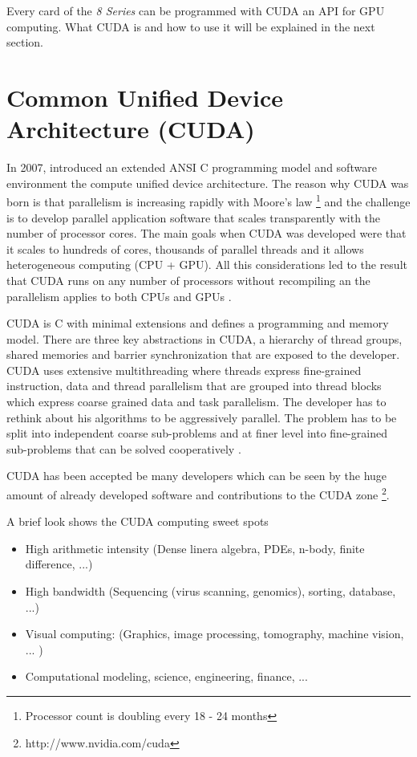 Every card of the \emph{8 Series} can be programmed with \gls{CUDA} an
\gls{API} for \gls{GPU} computing. What \gls{CUDA} is and how to use it will 
be explained in the next section. 


\section{Common Unified Device Architecture (CUDA)}%
\label{sub:common_unified_device_architecture_cuda_} 
In 2007, {} introduced an extended \gls{ANSI} C programming model and
software environment the compute unified device architecture. The reason why
\gls{CUDA} was born is that parallelism is increasing rapidly with Moore's law
\footnote{Processor count is doubling every 18 - 24 months} and the challenge is
to develop parallel application software that scales transparently with the
number of processor cores. The main goals when \gls{CUDA} was developed were
that it scales to hundreds of cores, thousands of parallel threads and it allows
heterogeneous computing (\gls{CPU} + \gls{GPU}). All this considerations led to
the result that \gls{CUDA} runs on any number of processors without recompiling
an the parallelism applies to both \glspl{CPU} and \glspl{GPU} 
\citep{citeulike:3839013}.

\Gls{CUDA} is C with minimal extensions and defines a programming and memory model.
There are three key abstractions in \gls{CUDA}, a hierarchy of thread groups, shared
memories and barrier synchronization \citep{citeulike:3325943} that are exposed
to the developer. \Gls{CUDA} uses extensive multithreading where threads express
fine-grained instruction, data and thread parallelism that are grouped into
thread blocks which express coarse grained data and task parallelism. The
developer has to rethink about his algorithms to be aggressively parallel.
The problem has to be split into independent coarse sub-problems and at finer
level into fine-grained sub-problems that can be solved cooperatively
\citep{citeulike:3325943}.

\Gls{CUDA} has been accepted be many developers which can be seen by the huge
amount of already developed software and contributions to the \gls{CUDA}
zone \footnote{http://www.nvidia.com/cuda}.

A brief look shows the \gls{CUDA} computing sweet 
spots\citep{citeulike:3839013}

\begin{itemize}
	\item High arithmetic intensity (Dense linera algebra, PDEs, n-body, 
			finite difference, ...) 
	\item High bandwidth (Sequencing (virus scanning, genomics), sorting, 			
			database, ...) 
	\item Visual computing: (Graphics, image processing, tomography, 
			machine vision, ... ) 
	\item Computational modeling, science, engineering, finance, ... 			
\end{itemize} 

